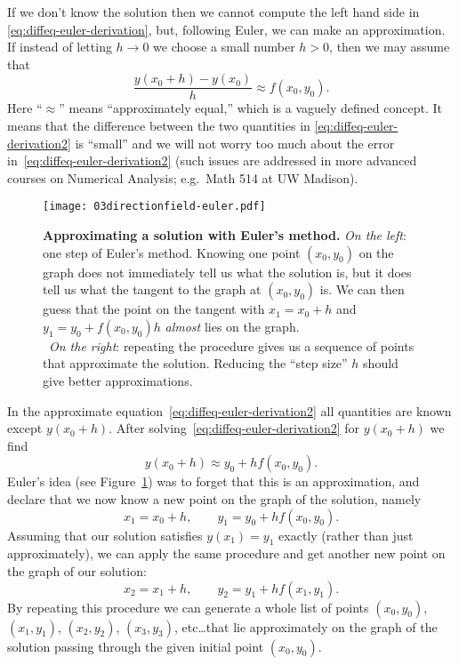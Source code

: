 If we don't know the solution then we cannot compute the left hand side in
\eqref{eq:diffeq-euler-derivation}, but, following Euler, we can make an
approximation.  If instead of letting $h\to0$ we choose a small number $h>0$, then we
may assume that
\begin{equation}
  \frac{y(x_0+h) - y(x_0)} {h}  \approx f(x_0, y_0).
  \label{eq:diffeq-euler-derivation2}
\end{equation}
Here ``$\approx$'' means ``approximately equal,'' which is a vaguely defined concept.
It means that the difference between the two quantities in
\eqref{eq:diffeq-euler-derivation2} is ``small'' and we will not worry too much about
the error in~\eqref{eq:diffeq-euler-derivation2} (such issues are addressed in more
advanced courses on Numerical Analysis; e.g.~Math 514 at UW Madison).
\begin{figure}
  \centering
  \problemfont%
  
  \noproblemfont
  \hfill
  \texttt{[image: 03directionfield-euler.pdf]}
  \caption{\textbf{Approximating a solution with Euler's method. } \textit{On the
      left}: one step of Euler's method.  Knowing one point $(x_0, y_0)$ on the graph
    does not immediately tell us what the solution is, but it does tell us what the
    tangent to the graph at $(x_0,y_0)$ is.  We can then guess that the point on the
    tangent with $x_1=x_0+h$ and $y_1=y_0+f(x_0, y_0)h$ \emph{almost} lies on the graph.\\
    ~\hspace{2em}\textit{On the right}: repeating the procedure gives us a sequence of points that
    approximate the solution.  Reducing the ``step size'' $h$ should give better
    approximations.}
  \label{fig:eulers-method}
\end{figure}
In the approximate equation~\eqref{eq:diffeq-euler-derivation2} all quantities are
known except $y(x_0+h)$.  After solving~\eqref{eq:diffeq-euler-derivation2} for
$y(x_0+h)$ we find
\[
  y(x_0+h) \approx y_0 + h f(x_0, y_0).
\]
Euler's idea (see Figure~\ref{fig:eulers-method}) was to forget that this is an
approximation, and declare that we now know a new point on the graph of the solution,
namely
\[
  x_1 = x_0+h, \qquad y_1 = y_0 + hf(x_0, y_0).
\]
Assuming that our solution satisfies $y(x_1) = y_1$ exactly (rather than just
approximately), we can apply the same procedure and get another new point on
the graph of our solution:
\[
x_2 = x_1+h, \qquad y_2 = y_1+hf(x_1,y_1).
\]
By repeating this procedure we can generate a whole list of points $(x_0, y_0)$,
$(x_1,y_1)$, $(x_2, y_2)$, $(x_3, y_3)$, etc\dots that lie approximately on the graph
of the solution passing through the given initial point $(x_0,y_0)$.

